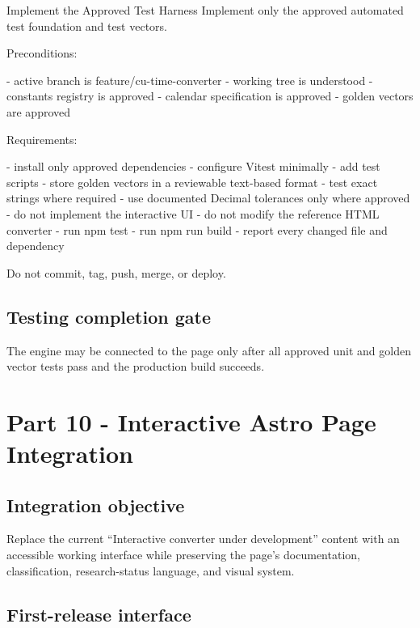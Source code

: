\documentclass[11pt,letterpaper]{article}
\begin{document}
\begin{promptbox}{Implement the Approved Test Harness}
Implement only the approved automated test foundation and test
vectors.

Preconditions:

- active branch is feature/cu-time-converter
- working tree is understood
- constants registry is approved
- calendar specification is approved
- golden vectors are approved

Requirements:

- install only approved dependencies
- configure Vitest minimally
- add test scripts
- store golden vectors in a reviewable text-based format
- test exact strings where required
- use documented Decimal tolerances only where approved
- do not implement the interactive UI
- do not modify the reference HTML converter
- run npm test
- run npm run build
- report every changed file and dependency

Do not commit, tag, push, merge, or deploy.
\end{promptbox}

\subsection{Testing completion gate}

\begin{successbox}
The engine may be connected to the page only after all approved unit and golden
vector tests pass and the production build succeeds.
\end{successbox}

\section{Part 10 - Interactive Astro Page Integration}

\subsection{Integration objective}

Replace the current ``Interactive converter under development'' content with
an accessible working interface while preserving the page's documentation,
classification, research-status language, and visual system.

\subsection{First-release interface}
\end{document}
